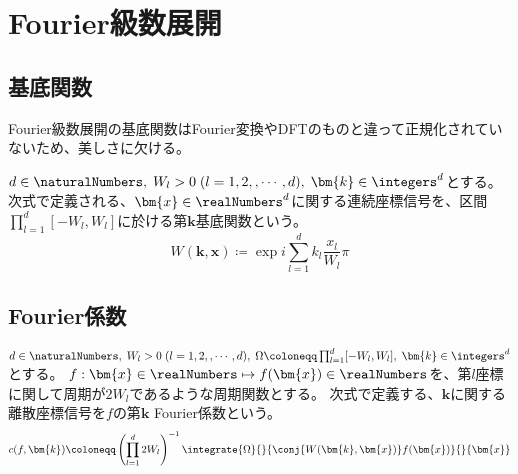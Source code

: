 \chapter{Fourier級数展開}
    \section{基底関数}
        Fourier級数展開の基底関数はFourier変換やDFTのものと違って正規化されていないため、美しさに欠ける。
        \par
        $d\in\naturalNumbers,\;W_l>0\;(l=1,2,,\cdots,d),\;\bm{k}\in\integers^d$とする。
        次式で定義される、$\bm{x}\in\realNumbers^d$に関する連続座標信号を、区間$\prod_{l=1}^d [-W_l,W_l]$に於ける第$\bm{k}$基底関数という。
        \[ W(\bm{k},\bm{x}) \coloneqq \exp i\sum_{l=1}^d k_l\frac{x_l}{W_l}\pi \]

    \section{Fourier係数}
        $d\in\naturalNumbers,\;W_l>0\;(l=1,2,,\cdots,d),\;\Omega\coloneqq\prod_{l=1}^d [-W_l,W_l],\;\bm{k}\in\integers^d$とする。
        $f:\bm{x}\in\realNumbers \mapsto f(\bm{x})\in\realNumbers$を、第$l$座標に関して周期が$2W_l$であるような周期関数とする。
        次式で定義する、$\bm{k}$に関する離散座標信号を$f$の第$\bm{k}$ Fourier係数という。
        \[ c(f,\bm{k}) \coloneqq \left(\prod_{l=1}^d 2W_l\right)^{-1}\integrate{\Omega}{}{\conj{W(\bm{k},\bm{x})}f(\bm{x})}{}{\bm{x}} \]